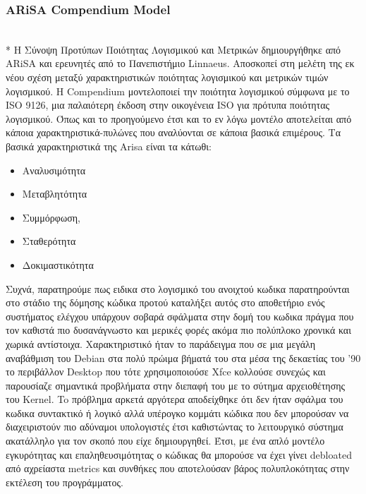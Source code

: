 \documentclass[a4paper, 11pt]{article}
\begin{document}
{{\subsubsection{\textlatin{ARiSA Compendium Model}}\\*
Η Σύνοψη Προτύπων Ποιότητας Λογισμικού και Μετρικών δημιουργήθηκε από
\textlatin{ARiSA} και ερευνητές από το Πανεπιστήμιο \textlatin{Linnaeus}. Αποσκοπεί στη μελέτη της εκ νέου
σχέση μεταξύ χαρακτηριστικών ποιότητας λογισμικού και μετρικών τιμών λογισμικού.
Η \textlatin{Compendium} μοντελοποιεί την ποιότητα λογισμικού σύμφωνα με το \textlatin{ISO 9126}, μια παλαιότερη έκδοση στην οικογένεια \textlatin{ISO} για πρότυπα ποιότητας λογισμικού.
Όπως και το προηγούμενο έτσι και το εν λόγω μοντέλο αποτελείται από κάποια χαρακτηριστικά-πυλώνες που αναλύονται σε κάποια βασικά επιμέρους. Tα βασικά χαρακτηριστικά της \textlatin{Arisa} είναι τα κάτωθι:
\begin{itemize}
\item Αναλυσιμότητα
\item Μεταβλητότητα
\item Συμμόρφωση, 
\item Σταθερότητα 
\item Δοκιμαστικότητα
\end{itemize}

Συχνά, παρατηρούμε πως ειδικα στο λογισμικό του ανοιχτού κωδικα παρατηρούνται στο στάδιο της δόμησης κώδικα προτού καταλήξει αυτός στο αποθετήριο ενός συστήματος ελέγχου υπάρχουν σοβαρά σφάλματα στην δομή του κωδικα πράγμα που τον καθιστά πιο δυσανάγνωστο και μερικές φορές ακόμα πιο πολύπλοκο χρονικά και χωρικά αντίστοιχα. Χαρακτηριστικό ήταν το παράδειγμα που σε μια μεγάλη αναβάθμιση του \textlatin{Debian} στα πολύ πρώιμα βήματά του στα μέσα της δεκαετίας του '90 το περιβάλλον \textlatin{Desktop} που τότε χρησιμοποιούσε \textlatin{Xfce} κολλούσε συνεχώς και  παρουσίαζε σημαντικά προβλήματα στην διεπαφή του με το σύτημα αρχειοθέτησης του \textlatin{Kernel}. To πρόβλημα αρκετά αργότερα αποδείχθηκε ότι δεν ήταν σφάλμα του κωδικα συντακτικό ή λογικό αλλά υπέρογκο κομμάτι κώδικα που δεν μπορούσαν να διαχειριστούν πιο αδύναμοι υπολογιστές έτσι καθιστώντας το λειτουργικό σύστημα ακατάλληλο για τον σκοπό που είχε δημιουργηθεί. Έτσι, με ένα απλό μοντέλο εγκυρότητας και επαληθευσιμότητας ο κώδικας θα μπορούσε να έχει γίνει \textlatin{debloated} από αχρείαστα \textlatin{metrics} και συνθήκες που αποτελούσαν βάρος πολυπλοκότητας στην εκτέλεση του προγράμματος.

}}
\end{document}
